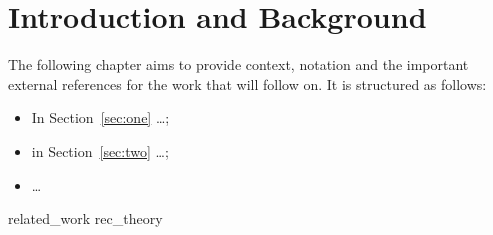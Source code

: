 \chapter{Introduction and Background}

The following chapter aims to provide context, notation and the
important external references for the work that will follow on. It is
structured as follows:

\begin{itemize}
\item In Section~\ref{sec:one} \dots;
\item in Section~\ref{sec:two} \dots;
\item \dots
\end{itemize}

{related_work}
{rec_theory}
